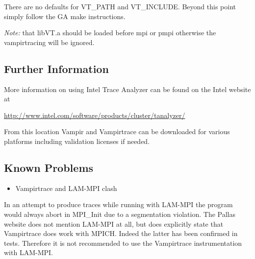 There are no defaults for VT\_PATH and VT\_INCLUDE. Beyond this point
simply follow the GA make instructions.

\emph{Note:} that libVT.a should be loaded before mpi or pmpi otherwise
the vampirtracing will be ignored. 


\subsection{Further Information }

More information on using Intel Trace Analyzer can be found on the
Intel website at

\href{http://www.intel.com/software/products/cluster/tanalyzer/}{http://www.intel.com/software/products/cluster/tanalyzer/}

From this location Vampir and Vampirtrace can be downloaded for various
platforms including validation licenses if needed.


\subsection{Known Problems}
\begin{itemize}
\item Vampirtrace and LAM-MPI clash
\end{itemize}
In an attempt to produce traces while running with LAM-MPI the program
would always abort in MPI\_Init due to a segmentation violation. The
Pallas website does not mention LAM-MPI at all, but does explicitly
state that Vampirtrace does work with MPICH. Indeed the latter has
been confirmed in tests. Therefore it is not recommended to use the
Vampirtrace instrumentation with LAM-MPI. 
